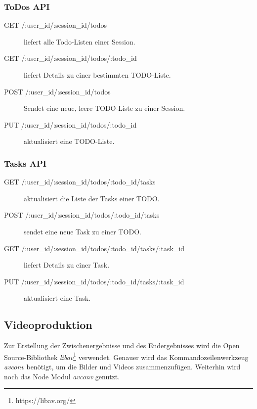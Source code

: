 \subsubsection{ToDos API}

\begin{description}

	\item[GET /:user\_id/:session\_id/todos] liefert alle Todo-Listen einer Session.
	\item[GET /:user\_id/:session\_id/todos/:todo\_id] liefert Details zu einer bestimmten TODO-Liste.
	\item[POST /:user\_id/:session\_id/todos] Sendet eine neue, leere TODO-Liste zu einer Session.
	
	\item[PUT /:user\_id/:session\_id/todos/:todo\_id] aktualisiert eine TODO-Liste.
	
\end{description}

\subsubsection{Tasks API}

\begin{description}

	\item[GET /:user\_id/:session\_id/todos/:todo\_id/tasks] aktualisiert die Liste der Tasks einer TODO.
	\item[POST /:user\_id/:session\_id/todos/:todo\_id/tasks] sendet eine neue Task zu einer TODO.
	
	\item[GET /:user\_id/:session\_id/todos/:todo\_id/tasks/:task\_id] liefert Details zu einer Task.
	
	\item[PUT /:user\_id/:session\_id/todos/:todo\_id/tasks/:task\_id] aktualisiert eine Task.
	  
\end{description}

\subsection{Videoproduktion}

Zur Erstellung der Zwischenergebnisse und des Endergebnisses wird die Open Source-Bibliothek \emph{libav}\footnote{https://libav.org/} verwendet. 
Genauer wird das Kommandozeilenwerkzeug \textit{avconv} benötigt, um die Bilder und Videos zusammenzufügen. 
Weiterhin wird noch das Node Modul \emph{avconv} genutzt. 

